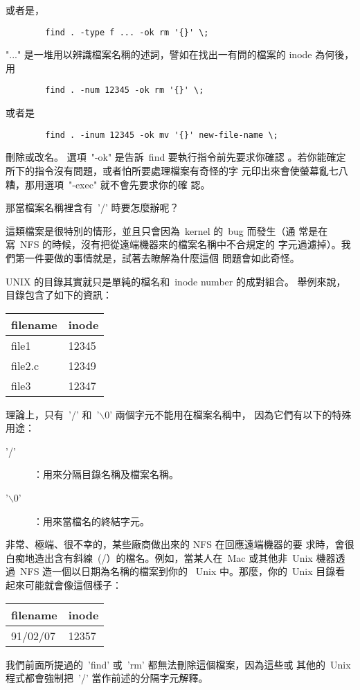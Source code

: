 \documentclass{article}
\begin{document}
\begin{CJK*}{Bg5}{ming}
	或者是，	
\begin{verbatim}
        find . -type f ... -ok rm '{}' \;
\end{verbatim}
	"..." 是一堆用以辨識檔案名稱的述詞，譬如在找出一有問的檔案的 
	inode 為何後，用
\begin{verbatim}
        find . -num 12345 -ok rm '{}' \;
\end{verbatim}
	或者是
\begin{verbatim}
        find . -inum 12345 -ok mv '{}' new-file-name \;
\end{verbatim}
	刪除或改名。 選項~"-ok" 是告訴~find 要執行指令前先要求你確認
	。若你能確定所下的指令沒有問題，或者怕所要處理檔案有奇怪的字
	元印出來會使螢幕亂七八糟，那用選項~"-exec" 就不會先要求你的確
	認。

	那當檔案名稱裡含有~'/' 時要怎麼辦呢？

	這類檔案是很特別的情形，並且只會因為~kernel 的~bug 而發生（通
	常是在寫~NFS 的時候，沒有把從遠端機器來的檔案名稱中不合規定的
	字元過濾掉）。我們第一件要做的事情就是，試著去瞭解為什麼這個
	問題會如此奇怪。

	UNIX 的目錄其實就只是單純的檔名和~inode number  的成對組合。
	舉例來說，目錄包含了如下的資訊：
\begin{table}[h]
\begin{tabular}{l l}
		filename & inode \\
\hline
		file1    & 12345 \\
		file2.c  & 12349 \\
		file3    & 12347 \\
\end{tabular}
\end{table}
	理論上，只有~'/' 和~'$\backslash$0' 兩個字元不能用在檔案名稱中，
	因為它們有以下的特殊用途：
\begin{description}
\item['/']	：用來分隔目錄名稱及檔案名稱。
\item['$\backslash$0']	：用來當檔名的終結字元。
\end{description}
	非常、極端、很不幸的，某些廠商做出來的 NFS 在回應遠端機器的要
	求時，會很白痴地造出含有斜線~(/）的檔名。例如，當某人在~Mac 
	或其他非~Unix 機器透過~NFS 造一個以日期為名稱的檔案到你的 
	~Unix 中。那麼，你的~Unix 目錄看起來可能就會像這個樣子：
\begin{table}[h]
\begin{tabular}{l l}
		filename & inode \\
		\hline 
		91/02/07 & 12357 \\
\end{tabular}
\end{table}
	我們前面所提過的~'find' 或~'rm' 都無法刪除這個檔案，因為這些或
	其他的~Unix 程式都會強制把~'/' 當作前述的分隔字元解釋。


\end{CJK*}
\end{document}
